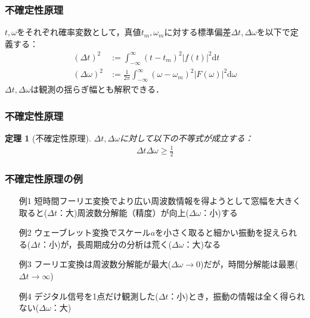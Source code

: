 \documentclass[dvipdfmx,graphicx,14pt]{beamer}
\newtheorem{mytheorem}{定理}
\begin{document}
\begin{frame}[c]
    \frametitle{不確定性原理}
    $t, \omega$をそれぞれ確率変数として，真値$t_{m}, \omega_{m}$に対する標準偏差$\Delta t, \Delta \omega$を以下で定義する：
    \begin{align}
        (\Delta t)^{2} &:= \int_{-\infty}^{\infty} (t - t_{m})^{2} |f(t)|^{2} \mathrm{d}t \\
        (\Delta \omega)^{2} &:= \frac{1}{2\pi} \int_{-\infty}^{\infty} (\omega - \omega_{m})^{2} |F(\omega)|^{2} \mathrm{d}\omega 
    \end{align}
    $\Delta t, \Delta \omega$は観測の揺らぎ幅とも解釈できる．
\end{frame}

\begin{frame}[c]
    \frametitle{不確定性原理}
    \begin{mytheorem}[不確定性原理]
        $\Delta t, \Delta \omega$に対して以下の不等式が成立する：
        \begin{align}
            \Delta t \Delta \omega \geq \frac{1}{2}
        \end{align}
    \end{mytheorem}
\end{frame}

\begin{frame}[c]
    \frametitle{不確定性原理の例}
    \begin{itemize}
        \item[例1] 短時間フーリエ変換でより広い周波数情報を得ようとして窓幅を大きく取ると($\Delta t$：大)周波数分解能（精度）が向上($\Delta \omega$：小)する
        \item[例2] ウェーブレット変換でスケール$a$を小さく取ると細かい振動を捉えられる($\Delta t$：小)が，長周期成分の分析は荒く($\Delta \omega$：大)なる
        \item[例3] フーリエ変換は周波数分解能が最大($\Delta \omega \to 0$)だが，時間分解能は最悪($\Delta t \to \infty$)
        \item[例4] デジタル信号を1点だけ観測した($\Delta t$：小)とき，振動の情報は全く得られない($\Delta \omega$：大)
    \end{itemize}
\end{frame}
\end{document}
